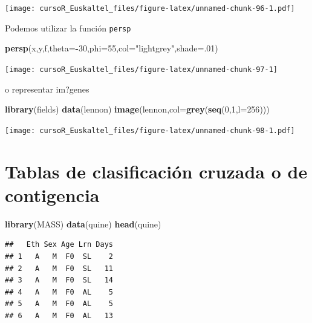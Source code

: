 \documentclass[]{book}
\newenvironment{Shaded}{\begin{snugshade}}{\end{snugshade}}
\newcommand{\KeywordTok}[1]{\textcolor[rgb]{0.13,0.29,0.53}{\textbf{#1}}}
\newcommand{\DataTypeTok}[1]{\textcolor[rgb]{0.13,0.29,0.53}{#1}}
\newcommand{\DecValTok}[1]{\textcolor[rgb]{0.00,0.00,0.81}{#1}}
\newcommand{\StringTok}[1]{\textcolor[rgb]{0.31,0.60,0.02}{#1}}
\newcommand{\OperatorTok}[1]{\textcolor[rgb]{0.81,0.36,0.00}{\textbf{#1}}}
\newcommand{\NormalTok}[1]{#1}
\begin{document}
\texttt{[image: cursoR\_Euskaltel\_files/figure-latex/unnamed-chunk-96-1.pdf]}

Podemos utilizar la función \texttt{persp}

\begin{Shaded}
\begin{Highlighting}[]
\KeywordTok{persp}\NormalTok{(x,y,f,}\DataTypeTok{theta=}\OperatorTok{-}\DecValTok{30}\NormalTok{,}\DataTypeTok{phi=}\DecValTok{55}\NormalTok{,}\DataTypeTok{col=}\StringTok{"lightgrey"}\NormalTok{,}\DataTypeTok{shade=}\NormalTok{.}\DecValTok{01}\NormalTok{)}
\end{Highlighting}
\end{Shaded}

\begin{center}\texttt{[image: cursoR\_Euskaltel\_files/figure-latex/unnamed-chunk-97-1]} \end{center}

o representar im?genes

\begin{Shaded}
\begin{Highlighting}[]
\KeywordTok{library}\NormalTok{(fields)}
\KeywordTok{data}\NormalTok{(lennon)}
\KeywordTok{image}\NormalTok{(lennon,}\DataTypeTok{col=}\KeywordTok{grey}\NormalTok{(}\KeywordTok{seq}\NormalTok{(}\DecValTok{0}\NormalTok{,}\DecValTok{1}\NormalTok{,}\DataTypeTok{l=}\DecValTok{256}\NormalTok{)))}
\end{Highlighting}
\end{Shaded}

\texttt{[image: cursoR\_Euskaltel\_files/figure-latex/unnamed-chunk-98-1.pdf]}

\section{Tablas de clasificación cruzada o de
contigencia}\label{tablas-de-clasificacion-cruzada-o-de-contigencia}

\begin{Shaded}
\begin{Highlighting}[]
\KeywordTok{library}\NormalTok{(MASS)}
\KeywordTok{data}\NormalTok{(quine)}
\KeywordTok{head}\NormalTok{(quine)}
\end{Highlighting}
\end{Shaded}

\begin{verbatim}
##   Eth Sex Age Lrn Days
## 1   A   M  F0  SL    2
## 2   A   M  F0  SL   11
## 3   A   M  F0  SL   14
## 4   A   M  F0  AL    5
## 5   A   M  F0  AL    5
## 6   A   M  F0  AL   13
\end{verbatim}
\end{document}

